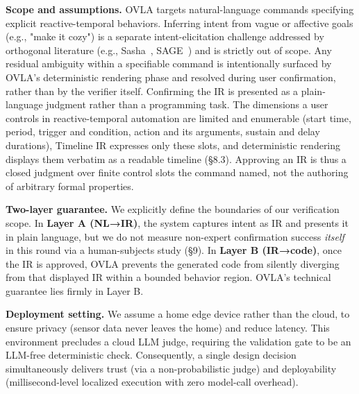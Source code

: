 \documentclass[sigconf,nonacm,anonymous,review]{acmart}
\begin{document}
\textbf{Scope and assumptions.} 
OVLA targets natural-language commands specifying explicit reactive-temporal behaviors. Inferring intent from vague or affective goals (e.g., "make it cozy") is a separate intent-elicitation challenge addressed by orthogonal literature (e.g., Sasha~\cite{sasha}, SAGE~\cite{sage}) and is strictly out of scope. Any residual ambiguity within a specifiable command is intentionally surfaced by OVLA's deterministic rendering phase and resolved during user confirmation, rather than by the verifier itself. 
Confirming the IR is presented as a plain-language judgment rather than a programming task. The dimensions a user controls in reactive-temporal automation are limited and enumerable (start time, period, trigger and condition, action and its arguments, sustain and delay durations), Timeline IR expresses only these slots, and deterministic rendering displays them verbatim as a readable timeline (\S8.3). Approving an IR is thus a closed judgment over finite control slots the command named, not the authoring of arbitrary formal properties.

\textbf{Two-layer guarantee.} We explicitly define the boundaries of our verification scope.
In \textbf{Layer A (NL→IR)}, the system captures intent as IR and presents it in plain language, but we do not measure non-expert confirmation success \emph{itself} in this round via a human-subjects study (\S9). In \textbf{Layer B (IR→code)}, once the IR is approved, OVLA prevents the generated code from silently diverging from that displayed IR within a bounded behavior region. OVLA's technical guarantee lies firmly in Layer B.

\textbf{Deployment setting.} We assume a home edge device rather than the cloud, to ensure privacy (sensor data never leaves the home) and reduce latency.
This environment precludes a cloud LLM judge, requiring the validation gate to be an LLM-free deterministic check. Consequently, a single design decision simultaneously delivers trust (via a non-probabilistic judge) and deployability (millisecond-level localized execution with zero model-call overhead).
\end{document}
